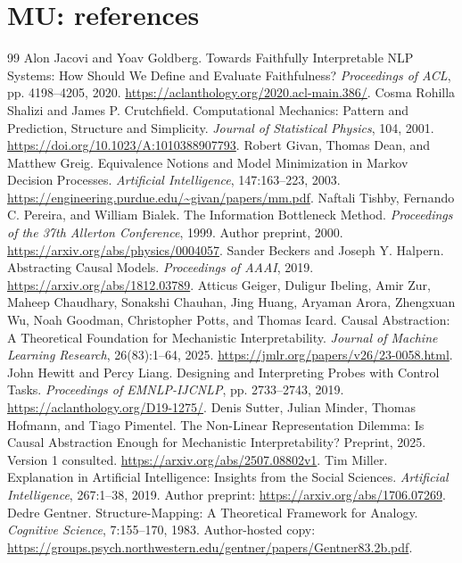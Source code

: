 \documentclass[11pt,oneside,openany]{book}
\numberwithin{equation}{section}
\begin{document}
\chapter{MU: references}
\begin{thebibliography}{99}\fontsize{9.5}{11}\selectfont
\setlength{\itemsep}{3pt}\setlength{\parsep}{0pt}\setlength{\parskip}{0pt}
 Alon Jacovi and Yoav Goldberg. Towards Faithfully Interpretable NLP Systems: How Should We Define and Evaluate Faithfulness? \emph{Proceedings of ACL}, pp. 4198--4205, 2020. \url{https://aclanthology.org/2020.acl-main.386/}.
 Cosma Rohilla Shalizi and James P. Crutchfield. Computational Mechanics: Pattern and Prediction, Structure and Simplicity. \emph{Journal of Statistical Physics}, 104, 2001. \url{https://doi.org/10.1023/A:1010388907793}.
 Robert Givan, Thomas Dean, and Matthew Greig. Equivalence Notions and Model Minimization in Markov Decision Processes. \emph{Artificial Intelligence}, 147:163--223, 2003. \url{https://engineering.purdue.edu/~givan/papers/mm.pdf}.
 Naftali Tishby, Fernando C. Pereira, and William Bialek. The Information Bottleneck Method. \emph{Proceedings of the 37th Allerton Conference}, 1999. Author preprint, 2000. \url{https://arxiv.org/abs/physics/0004057}.
 Sander Beckers and Joseph Y. Halpern. Abstracting Causal Models. \emph{Proceedings of AAAI}, 2019. \url{https://arxiv.org/abs/1812.03789}.
 Atticus Geiger, Duligur Ibeling, Amir Zur, Maheep Chaudhary, Sonakshi Chauhan, Jing Huang, Aryaman Arora, Zhengxuan Wu, Noah Goodman, Christopher Potts, and Thomas Icard. Causal Abstraction: A Theoretical Foundation for Mechanistic Interpretability. \emph{Journal of Machine Learning Research}, 26(83):1--64, 2025. \url{https://jmlr.org/papers/v26/23-0058.html}.
 John Hewitt and Percy Liang. Designing and Interpreting Probes with Control Tasks. \emph{Proceedings of EMNLP-IJCNLP}, pp. 2733--2743, 2019. \url{https://aclanthology.org/D19-1275/}.
 Denis Sutter, Julian Minder, Thomas Hofmann, and Tiago Pimentel. The Non-Linear Representation Dilemma: Is Causal Abstraction Enough for Mechanistic Interpretability? Preprint, 2025. Version 1 consulted. \url{https://arxiv.org/abs/2507.08802v1}.
 Tim Miller. Explanation in Artificial Intelligence: Insights from the Social Sciences. \emph{Artificial Intelligence}, 267:1--38, 2019. Author preprint: \url{https://arxiv.org/abs/1706.07269}.
 Dedre Gentner. Structure-Mapping: A Theoretical Framework for Analogy. \emph{Cognitive Science}, 7:155--170, 1983. Author-hosted copy: \url{https://groups.psych.northwestern.edu/gentner/papers/Gentner83.2b.pdf}.

\end{thebibliography}
\end{document}
